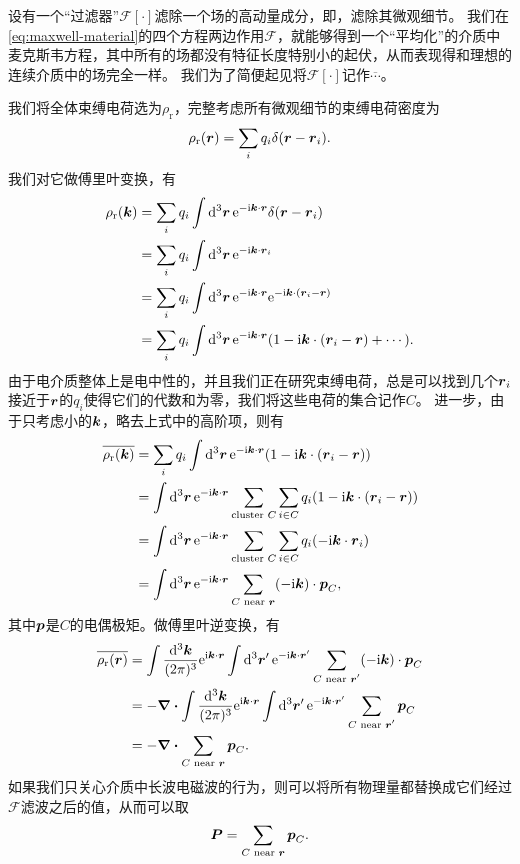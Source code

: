 设有一个“过滤器”$\mathcal{F}[\cdot]$滤除一个场的高动量成分，即，滤除其微观细节。
我们在\eqref{eq:maxwell-material}的四个方程两边作用$\mathcal{F}$，就能够得到一个“平均化”的介质中麦克斯韦方程，其中所有的场都没有特征长度特别小的起伏，从而表现得和理想的连续介质中的场完全一样。
我们为了简便起见将$\mathcal{F}[\cdot]$记作$\overline{\cdots}$。

我们将全体束缚电荷选为$\rho_\text{r}$，完整考虑所有微观细节的束缚电荷密度为
\[
    \rho_\text{r}(\vb*{r}) = \sum_i q_i \delta(\vb*{r} - \vb*{r}_i).
\]
我们对它做傅里叶变换，有
\[
    \begin{aligned}
        \rho_\text{r}(\vb*{k}) &= \sum_i q_i \int \dd[3]{\vb*{r}} \mathrm{e}^{- \mathrm{i} \vb*{k} \cdot \vb*{r}} \delta(\vb*{r} - \vb*{r}_i) \\
        &= \sum_i q_i \int \dd[3]{\vb*{r}} \mathrm{e}^{- \mathrm{i} \vb*{k} \cdot \vb*{r}_i} \\
        &= \sum_i q_i \int \dd[3]{\vb*{r}} \mathrm{e}^{- \mathrm{i} \vb*{k} \cdot \vb*{r}} \mathrm{e}^{- \mathrm{i} \vb*{k} \cdot (\vb*{r}_i - \vb*{r})} \\
        &= \sum_i q_i \int \dd[3]{\vb*{r}} \mathrm{e}^{- \mathrm{i} \vb*{k} \cdot \vb*{r}} (1 - \mathrm{i} \vb*{k} \cdot (\vb*{r}_i - \vb*{r}) + \cdots).
    \end{aligned}
\]
由于电介质整体上是电中性的，并且我们正在研究束缚电荷，总是可以找到几个$\vb*{r}_i$接近于$\vb*{r}$的$q_i$使得它们的代数和为零，我们将这些电荷的集合记作$C$。
进一步，由于只考虑小的$\vb*{k}$，略去上式中的高阶项，则有
\[
    \begin{aligned}
        \overline{\rho_\text{r}(\vb*{k})} &= \sum_i q_i \int \dd[3]{\vb*{r}} \mathrm{e}^{- \mathrm{i} \vb*{k} \cdot \vb*{r}} (1 - \mathrm{i} \vb*{k} \cdot (\vb*{r}_i - \vb*{r}) ) \\
        &= \int \dd[3]{\vb*{r}} \mathrm{e}^{- \mathrm{i} \vb*{k} \cdot \vb*{r}} \sum_{\text{cluster $C$}} \sum_{i \in C} q_i (1 - \mathrm{i} \vb*{k} \cdot (\vb*{r}_i - \vb*{r})) \\
        &= \int \dd[3]{\vb*{r}} \mathrm{e}^{- \mathrm{i} \vb*{k} \cdot \vb*{r}} \sum_{\text{cluster $C$}} \sum_{i \in C} q_i (- \mathrm{i} \vb*{k} \cdot \vb*{r}_i) \\
        &= \int \dd[3]{\vb*{r}} \mathrm{e}^{- \mathrm{i} \vb*{k} \cdot \vb*{r}} \sum_{\text{$C$ near $\vb*{r}$}} (- \mathrm{i} \vb*{k}) \cdot \vb*{p}_C,
    \end{aligned}
\]
其中$\vb*{p}$是$C$的电偶极矩。做傅里叶逆变换，有
\[
    \begin{aligned}
        \overline{\rho_\text{r}(\vb*{r})} &= \int \frac{\dd[3]{\vb*{k}}}{(2\pi)^3} \mathrm{e}^{\mathrm{i} \vb*{k} \cdot \vb*{r}} \int \dd[3]{\vb*{r}'} \mathrm{e}^{- \mathrm{i} \vb*{k} \cdot \vb*{r}'} \sum_{\text{$C$ near $\vb*{r}'$}} (- \mathrm{i} \vb*{k}) \cdot \vb*{p}_C \\
        &= - \div \int \frac{\dd[3]{\vb*{k}}}{(2\pi)^3} \mathrm{e}^{\mathrm{i} \vb*{k} \cdot \vb*{r}} \int \dd[3]{\vb*{r}'} \mathrm{e}^{- \mathrm{i} \vb*{k} \cdot \vb*{r}'} \sum_{\text{$C$ near $\vb*{r}'$}} \vb*{p}_C \\
        &= - \div{\sum_{\text{$C$ near $\vb*{r}$}} \vb*{p}_C}.
    \end{aligned}
\]
如果我们只关心介质中长波电磁波的行为，则可以将所有物理量都替换成它们经过$\mathcal{F}$滤波之后的值，从而可以取
\begin{equation}
    \vb*{P} = \sum_{\text{$C$ near $\vb*{r}$}} \vb*{p}_C.
\end{equation}

